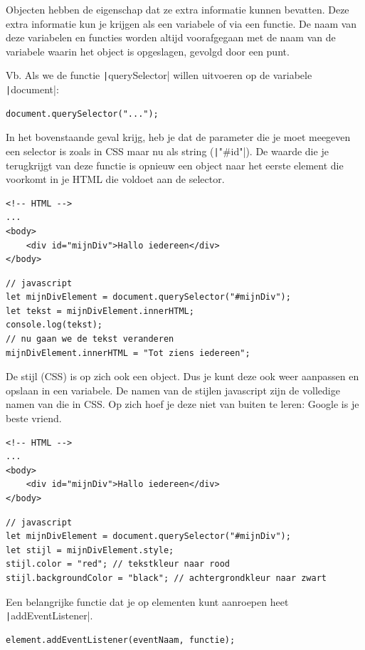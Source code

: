 Objecten hebben de eigenschap dat ze extra informatie kunnen bevatten. Deze
extra informatie kun je krijgen als een variabele of via een functie. De naam
van deze variabelen en functies worden altijd voorafgegaan met de naam van de 
variabele waarin het object is opgeslagen, gevolgd door een punt.

Vb. Als we de functie \texttt|querySelector| willen uitvoeren
op de variabele \texttt|document|:
\begin{verbatim}
document.querySelector("...");
\end{verbatim}

In het bovenstaande geval krijg, heb je dat de parameter die je moet meegeven
een selector is zoals in CSS maar nu als string
(\texttt|"#id"|). De waarde die je terugkrijgt van deze functie
is opnieuw een object naar het eerste element die voorkomt in je HTML die
voldoet aan de selector.
\begin{verbatim}
<!-- HTML -->
...
<body>
    <div id="mijnDiv">Hallo iedereen</div>
</body>
\end{verbatim}
\begin{verbatim}
// javascript
let mijnDivElement = document.querySelector("#mijnDiv");
let tekst = mijnDivElement.innerHTML;
console.log(tekst);
// nu gaan we de tekst veranderen
mijnDivElement.innerHTML = "Tot ziens iedereen";
\end{verbatim}

De stijl (CSS) is op zich ook een object. Dus je kunt deze ook weer aanpassen
en opslaan in een variabele. De namen van de stijlen javascript zijn de
volledige namen van die in CSS. Op zich hoef je deze niet van buiten te leren:
Google is je beste vriend.
\begin{verbatim}
<!-- HTML -->
...
<body>
    <div id="mijnDiv">Hallo iedereen</div>
</body>
\end{verbatim}
\begin{verbatim}
// javascript
let mijnDivElement = document.querySelector("#mijnDiv");
let stijl = mijnDivElement.style;
stijl.color = "red"; // tekstkleur naar rood
stijl.backgroundColor = "black"; // achtergrondkleur naar zwart
\end{verbatim}

Een belangrijke functie dat je op elementen kunt aanroepen heet \texttt|addEventListener|.
\begin{verbatim}
element.addEventListener(eventNaam, functie);
\end{verbatim}

